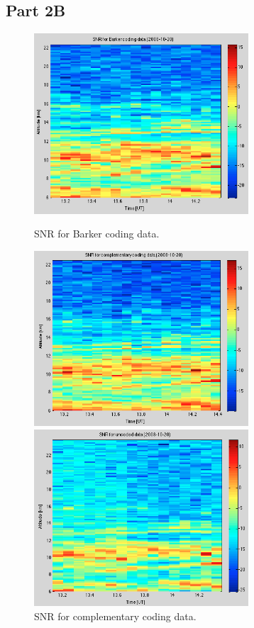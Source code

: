 \documentclass{article}
\begin{document}

\subsection{Part 2B}

\begin{figure}[htb]
\begin{minipage}[t]{0.5\linewidth}
\centering
\includegraphics[width=8cm]{Figures/SNR_barker.png}
\caption{SNR for Barker coding data.}
\label{fig:SNR_barker}
\end{minipage}
\begin{minipage}[t]{0.5\linewidth}
\centering
\includegraphics[width=8cm]{Figures/SNR_complementary.png}
\caption{SNR for complementary coding data.}
\label{fig:SNR_complementary}
\end{minipage}
\begin{minipage}[b]{0.5\linewidth}
\vspace{0.5cm}
\centering
\includegraphics[width=8cm]{Figures/SNR_uncoded.png}

\end{minipage}
\end{figure}
\end{document}

